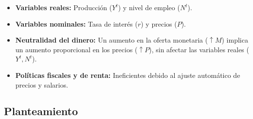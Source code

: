 \documentclass[
  doc,
  floatsintext,
  longtable,
  a4paper,
  nolmodern,
  notxfonts,
  notimes,
  colorlinks=true,linkcolor=blue,citecolor=blue,urlcolor=blue]{apa7}
\providecommand{\tightlist}{%
  \setlength{\itemsep}{0pt}\setlength{\parskip}{0pt}}
\begin{document}
\begin{itemize}
\tightlist
\item
  \textbf{Variables reales:} Producción (\(Y^t\)) y nivel de empleo
  (\(N^t\)).
\item
  \textbf{Variables nominales:} Tasa de interés (\(r\)) y precios
  (\(P\)).
\item
  \textbf{Neutralidad del dinero:} Un aumento en la oferta monetaria
  (\(\uparrow M\)) implica un aumento proporcional en los precios
  (\(\uparrow P\)), sin afectar las variables reales (\(Y^t, N^t\)).
\item
  \textbf{Políticas fiscales y de renta:} Ineficientes debido al ajuste
  automático de precios y salarios.
\end{itemize}

\subsection{Planteamiento}\label{planteamiento}
\end{document}
